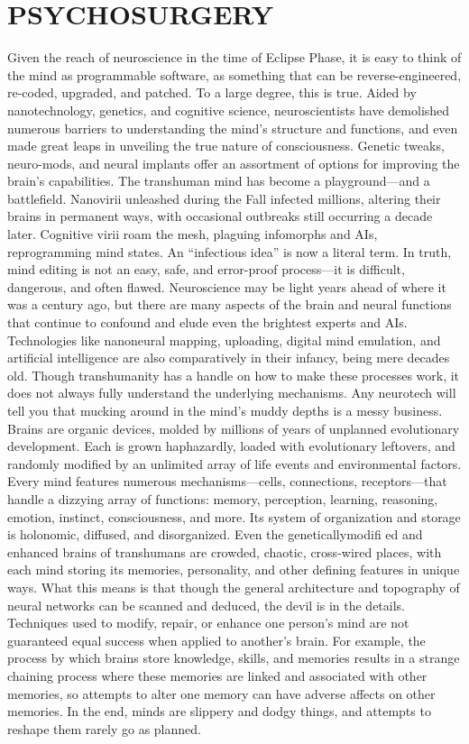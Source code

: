 \section{PSYCHOSURGERY} Given the reach of neuroscience in the time of Eclipse Phase, it is easy to think of the mind as programmable software, as something that can be reverse-engineered, re-coded, upgraded, and patched. To a large degree, this is true. Aided by nanotechnology, genetics, and cognitive science, neuroscientists have demolished numerous barriers to understanding the mind’s structure and functions, and even made great leaps in unveiling the true nature of consciousness. Genetic tweaks, neuro-mods, and neural implants offer an assortment of options for improving the brain’s capabilities. The transhuman mind has become a playground—and a battlefield. Nanovirii unleashed during the Fall infected millions, altering their brains in permanent ways, with occasional outbreaks still occurring a decade later. Cognitive virii roam the mesh, plaguing infomorphs and AIs, reprogramming mind states. An “infectious idea” is now a literal term. In truth, mind editing is not an easy, safe, and error-proof process—it is difficult, dangerous, and often flawed. Neuroscience may be light years ahead of where it was a century ago, but there are many aspects of the brain and neural functions that continue to confound and elude even the brightest experts and AIs. Technologies like nanoneural mapping, uploading, digital mind emulation, and artificial intelligence are also comparatively in their infancy, being mere decades old. Though transhumanity has a handle on how to make these processes work, it does not always fully understand the underlying mechanisms. Any neurotech will tell you that mucking around in the mind’s muddy depths is a messy business. Brains are organic devices, molded by millions of years of unplanned evolutionary development. Each is grown haphazardly, loaded with evolutionary leftovers, and randomly modified by an unlimited array of life events and environmental factors. Every mind features numerous mechanisms—cells, connections, receptors—that handle a dizzying array of functions: memory, perception, learning, reasoning, emotion, instinct, consciousness, and more. Its system of organization and storage is holonomic, diffused, and disorganized. Even the geneticallymodifi ed and enhanced brains of transhumans are crowded, chaotic, cross-wired places, with each mind storing its memories, personality, and other defining features in unique ways. What this means is that though the general architecture and topography of neural networks can be scanned and deduced, the devil is in the details. Techniques used to modify, repair, or enhance one person’s mind are not guaranteed equal success when applied to another’s brain. For example, the process by which brains store knowledge, skills, and memories results in a strange chaining process where these memories are linked and associated with other memories, so attempts to alter one memory can have adverse affects on other memories. In the end, minds are slippery and dodgy things, and attempts to reshape them rarely go as planned. 

